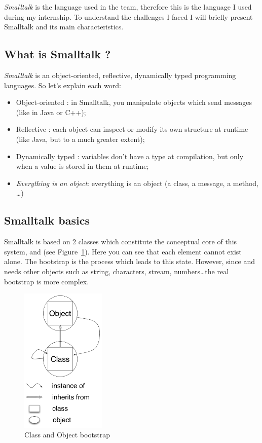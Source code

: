 \emph{\gls{Smalltalk}} is the language used in the team, therefore this is the language I used during my internship. To understand the challenges I faced I will briefly present \gls{Smalltalk} and its main characteristics.

\subsection {What is Smalltalk ?}

\emph{\gls{Smalltalk}} is an object-oriented, reflective, dynamically typed programming languages. So let's explain each word:


\begin{itemize}
	\item Object-oriented : in \gls{Smalltalk}, you manipulate objects which send messages (like in Java or C++);
	\item Reflective : each object can inspect or modify its own structure at runtime (like Java, but to a much greater extent);
	\item Dynamically typed : variables don't have a type at compilation, but only when a value is stored in them at runtime;
	\item \textit{Everything is an object}: everything is an object (a class, a message, a method, \dots)
\end{itemize}

\subsection{Smalltalk basics}

\gls{Smalltalk} is based on 2 classes which constitute the conceptual core of this system,  and  (see Figure~\ref{ClassObjectBootStrap}). Here you can see that each element cannot exist alone. The bootstrap is the process which leads to this state. However, since  and  needs other objects such as string, characters, stream, numbers\dots the real bootstrap is more complex.

\begin{figure}[h]
	\centering\includegraphics[height = 7cm]{figures/BootStrap}
	\caption{Class and Object bootstrap}
	\label{ClassObjectBootStrap}
\end{figure}
	
